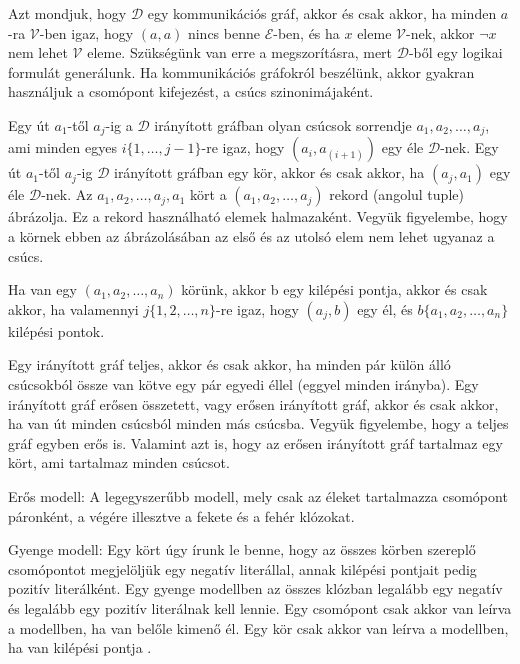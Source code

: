 \documentclass[
]{thesis-ekf}
\theoremstyle{definition}
\theoremstyle{remark}
\begin{document}
	Azt mondjuk, hogy $ \mathcal{D} $ egy kommunikációs gráf, akkor és csak akkor, ha minden $ a $-ra $ \mathcal{V} $-ben igaz, hogy $ (a,a) $ nincs benne $ \mathcal{E} $-ben, és ha $ x $ eleme $ \mathcal{V} $-nek, akkor $ \neg x $ nem lehet $ \mathcal{V} $ eleme. Szükségünk van erre a megszorításra, mert $ \mathcal{D} $-ből egy logikai formulát generálunk. Ha kommunikációs gráfokról beszélünk, akkor gyakran használjuk a csomópont kifejezést, a csúcs szinonimájaként.

	Egy út $ a_1 $-től $ a_j $-ig a $ \mathcal{D} $ irányított gráfban olyan csúcsok sorrendje $ a_1,a_2,\dots,a_j $, ami minden egyes $ i\{1,\dots,j-1\} $-re igaz, hogy $ (a_i,a_(i+1)) $ egy éle $ \mathcal{D} $-nek. Egy út $ a_1 $-től $ a_j $-ig $ \mathcal{D} $ irányított gráfban egy kör, akkor és csak akkor, ha $ (a_j,a_1) $ egy éle $ \mathcal{D} $-nek. Az $ a_1,a_2,\dots,a_j,a_1 $ kört a $ (a_1,a_2,\dots,a_j ) $ rekord (angolul tuple) ábrázolja. Ez a rekord használható elemek halmazaként. Vegyük figyelembe, hogy a körnek ebben az ábrázolásában az első és az utolsó elem nem lehet ugyanaz a csúcs.

	Ha van egy $ (a_1,a_2,\dots,a_n) $ körünk, akkor b egy kilépési pontja, akkor és csak akkor, ha valamennyi $ j\{1,2,\dots,n\} $-re igaz, hogy $ (a_j,b) $ egy él, és $ b\{a_1,a_2,\dots,a_n\} $ kilépési pontok.

	Egy irányított gráf teljes, akkor és csak akkor, ha minden pár külön álló csúcsokból össze van kötve egy pár egyedi éllel (eggyel minden irányba). Egy irányított gráf erősen összetett, vagy erősen irányított gráf, akkor és csak akkor, ha van út minden csúcsból minden más csúcsba. Vegyük figyelembe, hogy a teljes gráf egyben erős is. Valamint azt is, hogy az erősen irányított gráf tartalmaz egy kört, ami tartalmaz minden csúcsot.
	\cite[fordítás Kusper Gábor és társainak cikkjéből]{am}

	Erős modell: A legegyszerűbb modell, mely csak az éleket tartalmazza csomópont páronként, a végére illesztve a fekete és a fehér klózokat.
	
	Gyenge modell: Egy kört úgy írunk le benne, hogy az összes körben szereplő csomópontot megjelöljük egy negatív literállal, annak kilépési pontjait pedig pozitív literálként. Egy gyenge modellben az összes klózban legalább egy negatív és legalább egy pozitív literálnak kell lennie. Egy csomópont csak akkor van leírva a modellben, ha van belőle kimenő él. Egy kör csak akkor van leírva a modellben, ha van kilépési pontja \cite{sat-solving-50}.
	
\end{document}
